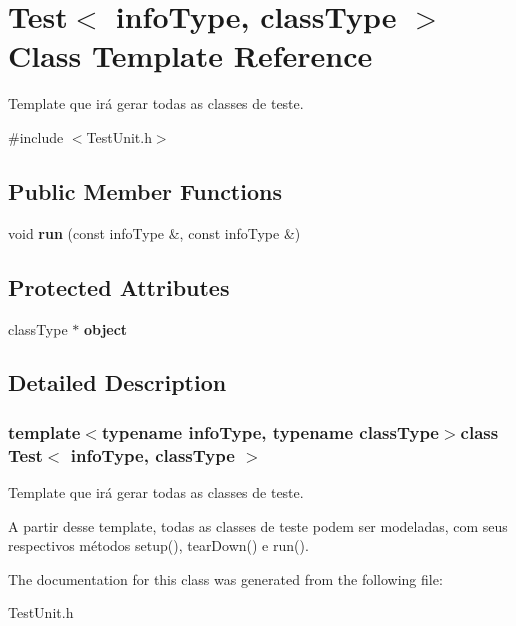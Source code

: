 \hypertarget{classTest}{\section{Test$<$ info\-Type, class\-Type $>$ Class Template Reference}
\label{classTest}
}


Template que irá gerar todas as classes de teste.  




{\ttfamily \#include $<$Test\-Unit.\-h$>$}

\subsection*{Public Member Functions}
\begin{DoxyCompactItemize}
\item 
\hypertarget{classTest_af4efb793913e8172ec96f64dd990b777}{void {\bfseries run} (const info\-Type \&, const info\-Type \&)}\label{classTest_af4efb793913e8172ec96f64dd990b777}

\end{DoxyCompactItemize}
\subsection*{Protected Attributes}
\begin{DoxyCompactItemize}
\item 
\hypertarget{classTest_ad228fd201d56aea9ebf26f7a5aefd2c1}{class\-Type $\ast$ {\bfseries object}}\label{classTest_ad228fd201d56aea9ebf26f7a5aefd2c1}

\end{DoxyCompactItemize}


\subsection{Detailed Description}
\subsubsection*{template$<$typename info\-Type, typename class\-Type$>$class Test$<$ info\-Type, class\-Type $>$}

Template que irá gerar todas as classes de teste. 

A partir desse template, todas as classes de teste podem ser modeladas, com seus respectivos métodos setup(), tear\-Down() e run(). 

The documentation for this class was generated from the following file\-:\begin{DoxyCompactItemize}
\item 
Test\-Unit.\-h\end{DoxyCompactItemize}
